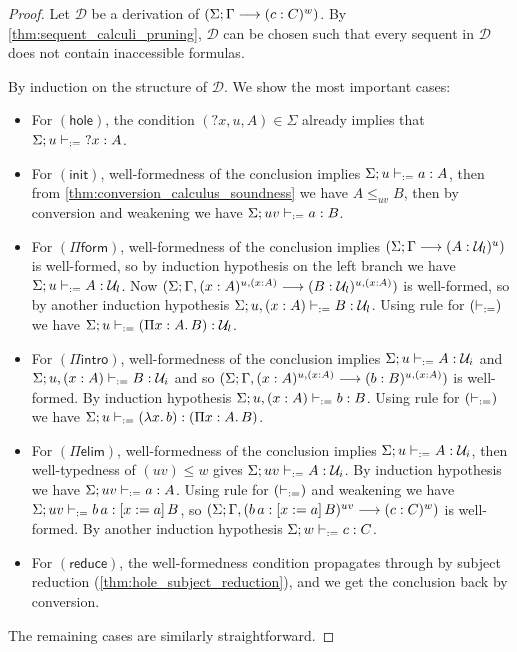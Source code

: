 \documentclass[twoside]{report}
\begin{document}
\begin{proof}
    Let $\mathcal D$ be a derivation of $(\Sigma; \Gamma \longrightarrow (c : C)^w)$. By \cref{thm:sequent_calculi_pruning}, $\mathcal D$ can be chosen such that every sequent in $\mathcal D$ does not contain inaccessible formulas.

    By induction on the structure of $\mathcal D$. We show the most important cases:

    \begin{itemize}
        \item For $(\mathsf{hole})$, the condition $({?x}, u, A) \in \Sigma$ already implies that $\Sigma; u \vdash_{:=} {?x} : A$.

        \item For $(\mathsf{init})$, well-formedness of the conclusion implies $\Sigma; u \vdash_{:=} a : A$, then from \cref{thm:conversion_calculus_soundness} we have $A \leq_{uv} B$, then by conversion and weakening we have $\Sigma; uv \vdash_{:=} a : B$.

        \item For $(\Pi\mathsf{form})$, well-formedness of the conclusion implies $(\Sigma; \Gamma \longrightarrow (A : \mathcal U_l)^u)$ is well-formed, so by induction hypothesis on the left branch we have $\Sigma; u \vdash_{:=} A : \mathcal U_l$. Now $(\Sigma; \Gamma, (x : A)^{u, (x : A)} \longrightarrow (B : \mathcal U_l)^{u, (x : A)})$ is well-formed, so by another induction hypothesis $\Sigma; u, (x : A) \vdash_{:=} B : \mathcal U_l$. Using rule for $(\vdash_{:=})$ we have $\Sigma; u \vdash_{:=} (\Pi{x} : {A}.\,{B}) : \mathcal U_l$.

        \item For $(\Pi\mathsf{intro})$, well-formedness of the conclusion implies $\Sigma; u \vdash_{:=} A : \mathcal U_i$ and $\Sigma; u, (x : A) \vdash_{:=} B : \mathcal U_i$ and so $(\Sigma; \Gamma, (x : A)^{u, (x : A)} \longrightarrow (b : B)^{u, (x : A)})$ is well-formed. By induction hypothesis $\Sigma; u, (x : A) \vdash_{:=} b : B$. Using rule for $(\vdash_{:=})$ we have $\Sigma; u \vdash_{:=} (\lambda{x}.\,{b}) : (\Pi{x} : {A}.\,{B})$.

        \item For $(\Pi\mathsf{elim})$, well-formedness of the conclusion implies $\Sigma; u \vdash_{:=} A : \mathcal U_i$, then well-typedness of $(uv) \leq w$ gives $\Sigma; uv \vdash_{:=} A : \mathcal U_i$. By induction hypothesis we have $\Sigma; uv \vdash_{:=} a : A$. Using rule for $(\vdash_{:=})$ and weakening we have $\Sigma; uv \vdash_{:=} {b}\,{a} : [{x}:={a}]\,{B}$, so $(\Sigma; \Gamma, ({b}\,{a} : [{x}:={a}]\,{B})^{uv} \longrightarrow (c : C)^w)$ is well-formed. By another induction hypothesis $\Sigma; w \vdash_{:=} c : C$.

        \item For $(\mathsf{reduce})$, the well-formedness condition propagates through by subject reduction (\cref{thm:hole_subject_reduction}), and we get the conclusion back by conversion.
    \end{itemize}

    The remaining cases are similarly straightforward.
\end{proof}
\end{document}
